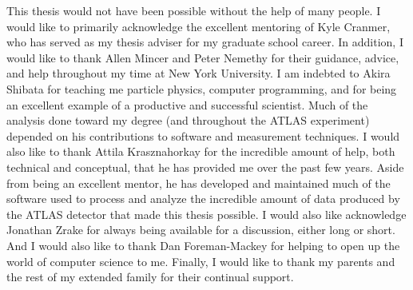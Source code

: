 %

This thesis would not have been possible without the help of many people.
I would like to primarily acknowledge the excellent mentoring of Kyle Cranmer, who has served as my thesis adviser for my graduate school career.
In addition, I would like to thank Allen Mincer and Peter Nemethy for their guidance, advice, and help throughout my time at New York University.
I am indebted to Akira Shibata for teaching me particle physics, computer programming, and for being an excellent example of a productive and successful scientist.
Much of the analysis done toward my degree (and throughout the ATLAS experiment) depended on his contributions to software and measurement techniques.
I would also like to thank Attila Krasznahorkay for the incredible amount of help, both technical and conceptual, that he has provided me over the past few years.
Aside from being an excellent mentor, he has developed and maintained much of the software used to process and analyze the incredible amount of data
produced by the ATLAS detector that made this thesis possible.
I would also like acknowledge Jonathan Zrake for always being available for a discussion, either long or short.
And I would also like to thank Dan Foreman-Mackey for helping to open up the world of computer science to me.
Finally, I would like to thank my parents and the rest of my extended family for their continual support.
